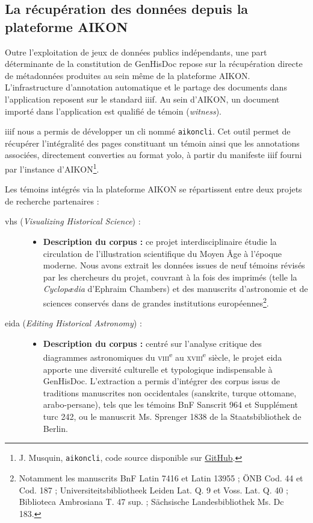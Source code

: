 \subsection{La récupération des données depuis la plateforme AIKON}

Outre l'exploitation de jeux de données publics indépendants, une part déterminante de la constitution de GenHisDoc repose sur la récupération directe de métadonnées produites au sein même de la plateforme AIKON. L'infrastructure d'annotation automatique et le partage des documents dans l'application reposent sur le standard \gls{iiif}. Au sein d'AIKON, un document importé dans l'application est qualifié de \og témoin \fg{} (\textit{witness}).

\gls{iiif} nous a permis de développer un \gls{cli} nommé \texttt{aikoncli}. Cet outil permet de récupérer l'intégralité des pages constituant un témoin ainsi que les annotations associées, directement converties au format \gls{yolo}, à partir du manifeste \gls{iiif} fourni par l'instance d'AIKON\footnote{J. Musquin, \texttt{aikoncli}, code source disponible sur \href{https://github.com/Anarchiviste/aikoncli}{GitHub}.}.

Les témoins intégrés via la plateforme AIKON se répartissent entre deux projets de recherche partenaires :

\begin{description}
	\item[\gls{vhs} (\textit{Visualizing Historical Science}) :] \hfill
	\begin{itemize}
		\item \textbf{Description du corpus :} ce projet interdisciplinaire étudie la circulation de l'illustration scientifique du Moyen Âge à l'époque moderne. Nous avons extrait les données issues de neuf témoins révisés par les chercheurs du projet, couvrant à la fois des imprimés (telle la \textit{Cyclopædia} d'Ephraim Chambers) et des manuscrits d'astronomie et de sciences conservés dans de grandes institutions européennes\footnote{Notamment les manuscrits BnF Latin 7416 et Latin 13955 ; ÖNB Cod. 44 et Cod. 187 ; Universiteitsbibliotheek Leiden Lat. Q. 9 et Voss. Lat. Q. 40 ; Biblioteca Ambrosiana T. 47 sup. ; Sächsische Landesbibliothek Ms. Dc 183.}.
	\end{itemize}
	
	\item[\gls{eida} (\textit{Editing Historical Astronomy}) :] \hfill
	\begin{itemize}
		\item \textbf{Description du corpus :} centré sur l'analyse critique des diagrammes astronomiques du \textsc{viii}\textsuperscript{e} au \textsc{xviii}\textsuperscript{e} siècle, le projet \gls{eida} apporte une diversité culturelle et typologique indispensable à GenHisDoc. L'extraction a permis d'intégrer des corpus issus de traditions manuscrites non occidentales (sanskrite, turque ottomane, arabo-persane), tels que les témoins BnF Sanscrit 964 et Supplément turc 242, ou le manuscrit Ms. Sprenger 1838 de la Staatsbibliothek de Berlin.
	\end{itemize}
\end{description}

